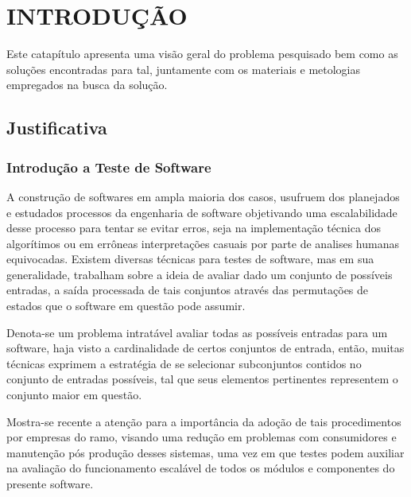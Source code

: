 \chapter{INTRODUÇÃO}
\label{cap:introdução}

Este catapítulo apresenta uma visão geral do problema pesquisado bem como as soluções encontradas para tal, juntamente com os materiais e metologias empregados na busca da solução.

\section{Justificativa}

\subsection{Introdução a Teste de Software}
A construção de softwares em ampla maioria dos casos, usufruem dos planejados e estudados processos da engenharia de software objetivando uma escalabilidade desse processo para tentar se evitar erros, seja na implementação técnica dos algorítimos ou em errôneas interpretações casuais por parte de analises humanas equivocadas. Existem diversas técnicas para testes de software, mas em sua generalidade, trabalham sobre a ideia de avaliar dado um conjunto de possíveis entradas, a saída processada de tais conjuntos através das permutações de estados que o software em questão pode assumir.

Denota-se um problema intratável avaliar todas as possíveis entradas para um software, haja visto a cardinalidade de certos conjuntos de entrada, então, muitas técnicas exprimem a estratégia de se selecionar subconjuntos contidos no conjunto de entradas possíveis, tal que seus elementos pertinentes representem o conjunto maior em questão.

Mostra-se recente a atenção para a importância da adoção de tais procedimentos por empresas do ramo, visando uma redução em problemas com consumidores e manutenção pós produção desses sistemas, uma vez em que testes podem auxiliar na avaliação do funcionamento escalável de todos os módulos e componentes do presente software.

